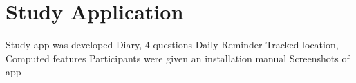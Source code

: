 \section{Study Application}
Study app was developed
Diary, 4 questions
Daily Reminder
Tracked location, Computed features
Participants were given an installation manual
Screenshots of app
